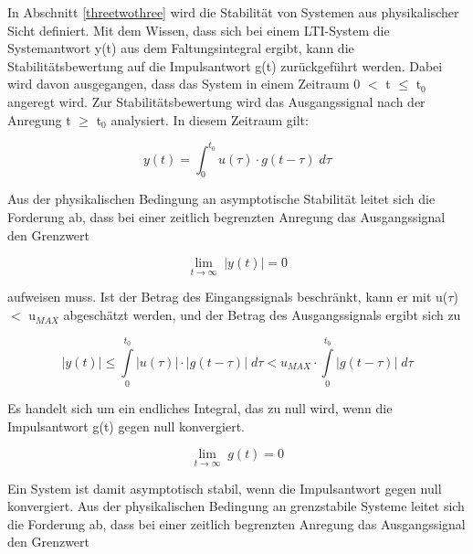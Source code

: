 \noindent In Abschnitt \ref{threetwothree} wird die Stabilit\"{a}t von Systemen aus physikalischer Sicht definiert. Mit dem Wissen, dass sich bei einem LTI-System die Systemantwort y(t) aus dem Faltungsintegral ergibt, kann die Stabilit\"{a}tsbewertung auf die Impulsantwort g(t) zur\"{u}ckgef\"{u}hrt werden. Dabei wird davon ausgegangen, dass das System in einem Zeitraum 0 $\mathrm{<}$ t $\leq$ t${}_{0}$ angeregt wird. Zur Stabilit\"{a}tsbewertung wird das Ausgangssignal nach der Anregung t $\geq$ t${}_{0}$ analysiert. In diesem Zeitraum gilt:

\begin{equation}\label{eq:threehundredeightyone}
y\left(t\right)=\int _{0}^{t_{0} }u\left(\tau \right)\cdot g\left(t-\tau \right)\;d\tau
\end{equation}

\noindent Aus der physikalischen Bedingung an asymptotische Stabilit\"{a}t leitet sich die Forderung ab, dass bei einer zeitlich begrenzten Anregung das Ausgangssignal den Grenzwert 

\begin{equation}\label{eq:threehundredeightytwo}
{\mathop{\lim }\limits_{t\to \infty }} \; \left|y\left(t\right)\right|=0
\end{equation}

\noindent aufweisen muss. Ist der Betrag des Eingangssignals beschr\"{a}nkt, kann er mit {\textbar}u($\tau$){\textbar} $\mathrm{<}$ u${}_{MAX}$ abgesch\"{a}tzt werden, und der Betrag des Ausgangssignals ergibt sich zu

\begin{equation}\label{eq:threehundredeightythree}
\left|y\left(t\right)\right|\le \int\limits _{0}^{t_{0} }\left|u\left(\tau \right)\right|\cdot \left|g\left(t-\tau \right)\right|\;d\tau  <u_{MAX} \cdot \int\limits _{0}^{t_{0} }\left|g\left(t-\tau \right)\right|\;d\tau 
\end{equation}

\noindent Es handelt sich um ein endliches Integral, das zu null wird, wenn die Impulsantwort g(t) gegen null konvergiert.

\begin{equation}\label{eq:threehundredeightyfour}
{\mathop{\lim }\limits_{t\to \infty }} \; g\left(t\right)=0
\end{equation}

\noindent Ein System ist damit asymptotisch stabil, wenn die Impulsantwort gegen null konvergiert. Aus der physikalischen Bedingung an grenzstabile Systeme leitet sich die Forderung ab, dass bei einer zeitlich begrenzten Anregung das Ausgangssignal den Grenzwert 

